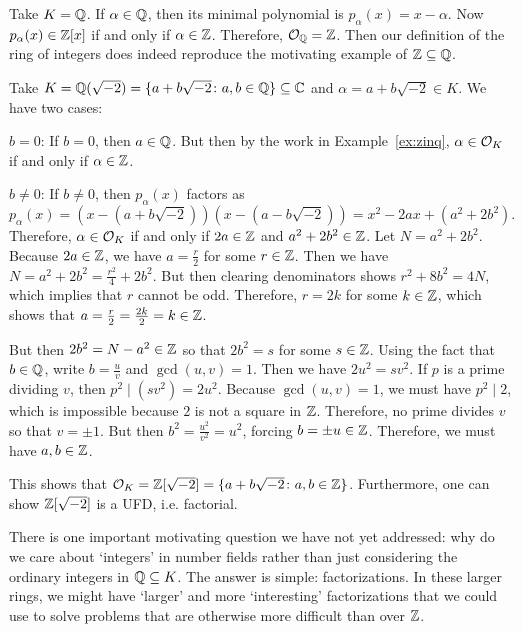 \begin{ex}\label{ex:zinq}
Take $K= \mathbb{Q}$. If $\alpha \in \mathbb{Q}$, then its minimal polynomial is $p_\alpha(x)= x - \alpha$. Now $p_\alpha(x) \in \mathbb{Z}[x]$ if and only if $\alpha \in \mathbb{Z}$. Therefore, $\mathcal{O}_{\mathbb{Q}}= \mathbb{Z}$. Then our definition of the ring of integers does indeed reproduce the motivating example of $\mathbb{Z} \subseteq \mathbb{Q}$. \xqed
\end{ex}


\begin{ex}
Take $K=\mathbb{Q}(\sqrt{-2})= \{ a + b \sqrt{-2} \colon a,b \in \mathbb{Q} \} \subseteq \mathbb{C}$ and $\alpha= a + b\sqrt{-2} \in K$. We have two cases: \pskip

\noindent $b=0$: If $b=0$, then $a \in \mathbb{Q}$. But then by the work in Example~\ref{ex:zinq}, $\alpha \in \mathcal{O}_K$ if and only if $\alpha \in \mathbb{Z}$. \pskip

\noindent $b\neq 0$: If $b \neq 0$,  then $p_\alpha(x)$ factors as 
	\[
	p_\alpha(x)=(x-(a+b\sqrt{-2}))(x-(a-b\sqrt{-2}))=x^2-2ax+(a^2+2b^2).
	\]
Therefore, $\alpha \in \mathcal{O}_K$ if and only if $2a \in \mathbb{Z}$ and $a^2+2b^2 \in \mathbb{Z}$. Let $N= a^2 + 2b^2$. Because $2a \in \mathbb{Z}$, we have $a= \frac{r}{2}$ for some $r \in \mathbb{Z}$. Then we have $N= a^2 + 2b^2= \frac{r^2}{4} + 2b^2$. But then clearing denominators shows $r^2 + 8b^2= 4N$, which implies that $r$ cannot be odd. Therefore, $r= 2k$ for some $k \in \mathbb{Z}$, which shows that $a= \frac{r}{2}= \frac{2k}{2}= k \in \mathbb{Z}$. 

But then $2b^2= N - a^2 \in \mathbb{Z}$ so that $2b^2= s$ for some $s \in \mathbb{Z}$. Using the fact that $b \in \mathbb{Q}$, write $b= \frac{u}{v}$ and $\gcd(u, v)= 1$. Then we have $2u^2= sv^2$. If $p$ is a prime dividing $v$, then $p^2 \mid (sv^2)= 2u^2$. Because $\gcd(u,v)=1$, we must have $p^2 \mid 2$, which is impossible because $2$ is not a square in $\mathbb{Z}$. Therefore, no prime divides $v$ so that $v= \pm 1$. But then $b^2= \frac{u^2}{v^2}= u^2$, forcing $b= \pm u \in \mathbb{Z}$. Therefore, we must have $a, b \in \mathbb{Z}$. \pskip
	
This shows that $\mathcal{O}_K= \mathbb{Z}[\sqrt{-2}]= \{ a + b \sqrt{-2} \colon a,b \in \mathbb{Z} \}$. Furthermore, one can show $\mathbb{Z}[\sqrt{-2}]$ is a UFD, i.e. factorial. \xqed
\end{ex}


There is one important motivating question we have not yet addressed: why do we care about `integers' in number fields rather than just considering the ordinary integers in $\mathbb{Q} \subseteq K$. The answer is simple: factorizations. In these larger rings, we might have `larger' and more `interesting' factorizations that we could use to solve problems that are otherwise more difficult than over $\mathbb{Z}$. 


